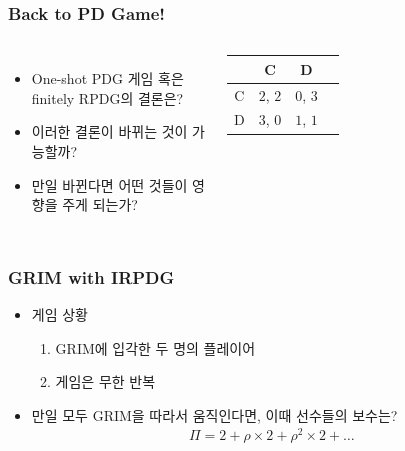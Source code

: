 \documentclass[final]{beamer}
\begin{document}
\begin{frame}\frametitle{Back to PD Game!}\vspace{3.5em}
\begin{columns}[c]
\column{18em}
\begin{itemize}
	\item One-shot PDG 게임 혹은 finitely RPDG의 결론은? 
	\item 이러한 결론이 바뀌는 것이 가능할까?
	\item 만일 바뀐다면 어떤 것들이 영향을 주게 되는가? 
\end{itemize}
\column{13em}
\begin{table}
\setlength{\tabcolsep}{1.2em}
\begin{tabular}{|c|c|c|c|} \hline
& {C} &  {D}\\ \hline
{C} & {$2$}, {$2$} & {$0$}, {$3$} \\ \hline%
{D} & {$3$}, {$0$}  & {$1$}, {$1$}\\ 
\hline
\end{tabular}
\end{table}
\end{columns}
\end{frame}

\begin{frame}\frametitle{GRIM with IRPDG}\vspace{3.5em}
\begin{itemize}
\item  게임 상황 
	\begin{enumerate}
		\item GRIM에 입각한 두 명의 플레이어 
		\item 게임은 무한 반복
	\end{enumerate}
\item 만일 모두 GRIM을 따라서 움직인다면, 이때 선수들의 보수는?
%
\begin{align*}
\Pi = 2 + \rho \times 2 + \rho^2 \times 2 + \ldots 
\end{align*}
%
\end{itemize}
\end{frame}
\end{document}
